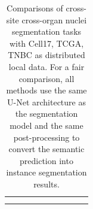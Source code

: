 \documentclass[letterpaper]{article} %
\begin{document}
\begin{table}
{\begin{tabular}{c|ccccc|cccc}
&\cellcolor{gray1}{TCGA}  &\cellcolor{gray1}{76.59} &\cellcolor{gray1}{72.67} &\cellcolor{gray1}{53.04} &\cellcolor{gray1}{12.69} & & &  \\
&\cellcolor{gray2}{TNBC}  &\cellcolor{gray2}{75.01} &\cellcolor{gray2}{74.03} &\cellcolor{gray2}{50.76} &\cellcolor{gray2}{29.54} & & &  \\ 
\bottomrule
\end{tabular}}
\caption{Comparisons of cross-site cross-organ nuclei segmentation tasks with Cell17, TCGA, TNBC as distributed local data. For a fair comparison, all methods use the same U-Net architecture as the segmentation model and the same post-processing to convert the semantic prediction into instance segmentation results.
} 
\label{tab:nucleicrosssite}
\end{table}








\end{document}
